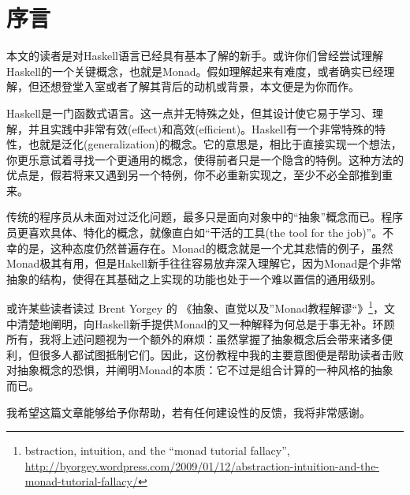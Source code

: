 \section{序言}

本文的读者是对Haskell语言已经具有基本了解的新手。或许你们曾经尝试理解Haskell的一个关键概念，也就是Monad。假如理解起来有难度，或者确实已经理解，但还想登堂入室或者了解其背后的动机或背景，本文便是为你而作。

Haskell是一门函数式语言。这一点并无特殊之处，但其设计使它易于学习、理解，并且实践中非常有效(effect)和高效(efficient)。Haskell有一个非常特殊的特性，也就是泛化(generalization)的概念。它的意思是，相比于直接实现一个想法，你更乐意试着寻找一个更通用的概念，使得前者只是一个隐含的特例。这种方法的优点是，假若将来又遇到另一个特例，你不必重新实现之，至少不必全部推到重来。

传统的程序员从未面对过泛化问题，最多只是面向对象中的“抽象”概念而已。程序员更喜欢具体、特化的概念，就像直白如“干活的工具(the tool for the job)”。不幸的是，这种态度仍然普遍存在。Monad的概念就是一个尤其悲情的例子，虽然Monad极其有用，但是Hakell新手往往容易放弃深入理解它，因为Monad是个非常抽象的结构，使得在其基础之上实现的功能也处于一个难以置信的通用级别。

或许某些读者读过 Brent Yorgey 的 《抽象、直觉以及”Monad教程解谬“》\footnote{bstraction, intuition, and the ``monad tutorial fallacy'', \url{http://byorgey.wordpress.com/2009/01/12/abstraction-intuition-and-the-monad-tutorial-fallacy/}}，文中清楚地阐明，向Haskell新手提供Monad的又一种解释为何总是于事无补。环顾所有，我将上述问题视为一个额外的麻烦：虽然掌握了抽象概念后会带来诸多便利，但很多人都试图抵制它们。因此，这份教程中我的主要意图便是帮助读者击败对抽象概念的恐惧，并阐明Monad的本质：它不过是组合计算的一种风格的抽象而已。

我希望这篇文章能够给予你帮助，若有任何建设性的反馈，我将非常感谢。